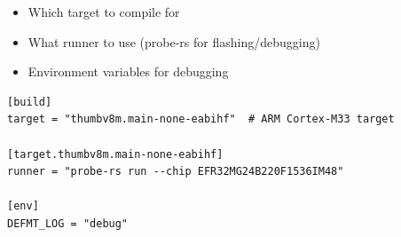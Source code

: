 \begin{itemize}
    \item Which target to compile for
    \item What runner to use (probe-rs for flashing/debugging)
    \item Environment variables for debugging
\end{itemize}

\begin{verbatim}
[build]
target = "thumbv8m.main-none-eabihf"  # ARM Cortex-M33 target

[target.thumbv8m.main-none-eabihf]
runner = "probe-rs run --chip EFR32MG24B220F1536IM48"

[env]
DEFMT_LOG = "debug"
\end{verbatim}
